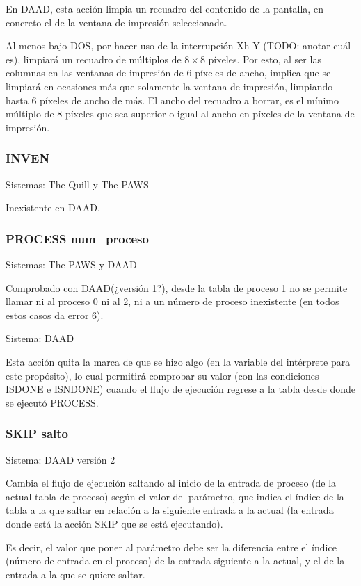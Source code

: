 \documentclass[11pt, a5paper]{article}
\newcommand{\quill}{\textsf{The Quill}\xspace}
\newcommand{\paw}{\textsf{The PAWS}\xspace}
\newcommand{\daad}{\textsf{DAAD}\xspace}
\newcommand{\sistema}[1]{\noindent Sistema: #1 \nopagebreak}
\newcommand{\sistemas}[1]{\noindent Sistemas: #1 \nopagebreak}
\begin{document}
En \daad, esta acción limpia un recuadro del contenido de la pantalla, en concreto el de la ventana de impresión seleccionada.

Al menos bajo DOS, por hacer uso de la interrupción Xh Y (TODO: anotar cuál es), limpiará un recuadro de múltiplos de $8 \times 8$ píxeles. Por esto, al ser las columnas en las ventanas de impresión de 6 píxeles de ancho, implica que se limpiará en ocasiones más que solamente la ventana de impresión, limpiando hasta 6 píxeles de ancho de más. El ancho del recuadro a borrar, es el mínimo múltiplo de 8 píxeles que sea superior o igual al ancho en píxeles de la ventana de impresión.

\subsubsection{INVEN}

\sistemas{\quill y \paw}

Inexistente en \daad.

\subsubsection{PROCESS num\_proceso}

\sistemas{\paw y \daad}

Comprobado con \daad (¿versión 1?), desde la tabla de proceso 1 no se permite llamar ni al proceso 0 ni al 2, ni a un número de proceso inexistente (en todos estos casos da error 6).

\sistema{\daad}

Esta acción quita la marca de que se hizo algo (en la variable del intérprete para este propósito), lo cual permitirá comprobar su valor (con las condiciones ISDONE e ISNDONE) cuando el flujo de ejecución regrese a la tabla desde donde se ejecutó PROCESS.

\subsubsection{SKIP salto}

\sistema{\daad versión 2}

Cambia el flujo de ejecución saltando al inicio de la entrada de proceso (de la actual tabla de proceso) según el valor del parámetro, que indica el índice de la tabla a la que saltar en relación a la siguiente entrada a la actual (la entrada donde está la acción SKIP que se está ejecutando).

Es decir, el valor que poner al parámetro debe ser la diferencia entre el índice (número de entrada en el proceso) de la entrada siguiente a la actual, y el de la entrada a la que se quiere saltar.
\end{document}

